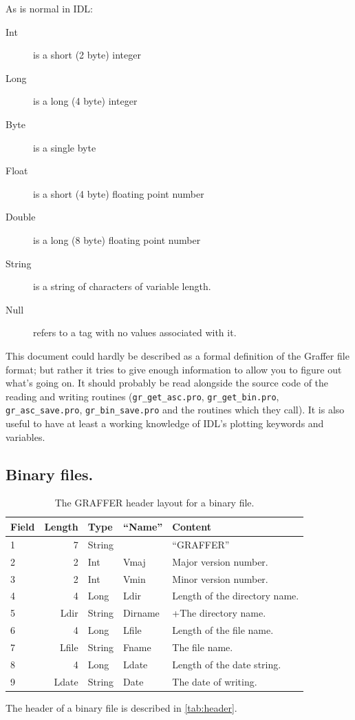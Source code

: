 \documentclass[english]{article}
\begin{document}
As is normal in IDL:

\begin{description}
\item [Int] is a short (2 byte) integer
\item [Long] is a long (4 byte) integer
\item [Byte] is a single byte
\item [Float] is a short (4 byte) floating point number
\item [Double] is a long (8 byte) floating point number
\item [String] is a string of characters of variable length.
\item [Null] refers to a tag with no values associated with it.
\end{description}

This document could hardly be described as a formal definition of
the Graffer file format; but rather it tries to give enough information
to allow you to figure out what's going on. It should probably be
read alongside the source code of the reading and writing routines
(\texttt{gr\_get\_asc.pro}, \texttt{gr\_get\_bin.pro},
\texttt{gr\_asc\_save.pro}, 
\texttt{gr\_bin\_save.pro} and the routines which they call). It is
also useful to have at least a working knowledge of IDL's plotting
keywords and variables.


\subsection{Binary files.}
\begin{table}
  \centering
  \begin{tabular}{lrlll}
    \hline
    Field & Length & Type & ``Name'' & Content \\
    \hline
    1 & 7 & String & & ``GRAFFER''\\
    2 & 2 & Int & Vmaj & Major version number. \\
    3 & 2 & Int & Vmin & Minor version number. \\
    4 & 4 & Long & Ldir & Length of the directory name. \\
    5 & Ldir & String & Dirname & +The directory name. \\
    6 & 4 & Long & Lfile & Length of the file name. \\
    7 & Lfile & String & Fname & The file name.\\
    8 & 4 & Long & Ldate & Length of the date string.\\
    9 & Ldate & String & Date & The date of writing.\\
    \hline
  \end{tabular}
  \caption{The GRAFFER header layout for a binary file.}
  \label{tab:header}
\end{table}
The header of a binary file is described in \autoref{tab:header}.
\end{document}

